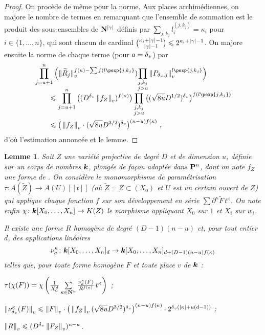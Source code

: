\documentclass[11pt, twoside, a4paper]{article}
\newtheorem{lem}[thm]{Lemme} \newtheorem{coro}[thm]{Corollaire}
\theoremstyle{definition}
\begin{document}
\begin{proof}
  On procède de même pour la norme. Aux places archimédiennes, on majore le
  nombre de termes en remarquant que l'ensemble de sommation est le produit des
  sous-ensembles de $\mathbf{N}^{{\lvert\gamma\rvert}}$ définis par $\sum_{j, k_j} l_i^ {(j, k_j)}
  = \kappa_i$ pour $i \in \{1,\ldots,n\}$, qui sont chacun de cardinal
  $\binom{\kappa_i + {\lvert\gamma\rvert} - 1}{{\lvert\gamma\rvert} - 1} \leqslant 2^{\kappa_i +
    {\lvert\gamma\rvert} - 1}$. On majore ensuite la norme de chaque terme (pour $a =
  {\delta\smash{_v}}$) par
  \begin{align*}
    & \prod_{j=u+1}^n \left( \nv{\smash{\widetilde R_j}}^{f(\kappa) - \sum
        f(l\pexp{j, k_j}}) \smash{\prod_{\substack{j, k_j \\ j > u}}}
      \nv{P_{\dv, j}}^{l\pexp{j, k_j}} \right) \\
    & \qquad\le \prod_{j=u+1}^n \big( (D^\dv \nv{f_Z})^{f(\kappa)} \big)
      \prod_{\substack{j, k_j \\ j > u}}  \big( (\sqrt{8u} D^{1/2})^\dv
      \big)^{f(l\pexp{j, k_j})} \\
    & \qquad\le \big( \nv{f_Z} \cdot (\sqrt{8u}D^{3/2})^\dv
      \big)^{(n-u)f(\kappa)} \pmm,
  \end{align*}
  d'où l'estimation annoncée et le lemme.
\end{proof}

\begin{lem} \label{l-param}
  Soit $Z$ une variété projective de degré $D$ et de dimension $u$, définie
  sur un corps de nombres $\boldsymbol{k}$, plongée de façon adaptée dans $\mathbf{P}^n$, dont
  on note $f_Z$ une forme de . On considère le monomorphisme de
  paramétrisation $\tau \colon A(\widetilde Z) \to A(U)[[t]]$ (où $\widetilde Z
  = Z \subset (X_0)$ et $U$ est un certain ouvert de $Z$) qui applique chaque
  fonction $f$ sur son développement en série $\sum \partial^\kappa \tilde F \,
  t^\kappa$.  On note enfin $\chi \colon \boldsymbol{k}[X_0, \ldots, X_n] \to K(Z)$ le
  morphisme appliquant $X_0$ sur $1$ et $X_i$ sur $w_i$.

  Il existe une forme $R$ homogène de degré $(D-1)(n-u)$ et, pour tout entier
  $d$, des applications linéaires \[ \nu_a^\kappa \colon \boldsymbol{k}[X_0, \ldots,
  X_n]_d \to \boldsymbol{k}[X_0, \ldots, X_n]_{d + (D-1)(n-u)f(\kappa)} \] telles que,
  pour toute forme homogène $F$ et toute place $v$ de $\boldsymbol{k}$ :
  \begin{enumthm}
    \item $\tau(\chi(F)) = \chi\left( \frac1{X_0^d} \sum\limits_{\kappa \in
        \mathbf{N}^u} \frac {\nu_a^\kappa(F)} {R^{f(\kappa)}} \, t^\kappa \right)$  ;
    \item $\left\lVert\nu_{\delta\smash{_v}}^\kappa(F)\right\rVert_{v} \leqslant \left\lVert F\right\rVert_{v} \cdot \big( \left\lVert f_Z\right\rVert_{v}
      (\sqrt{8u}D^{3/2})^{\delta\smash{_v}} \big)^{(n-u)f(\kappa)} \cdot 2^{{\delta\smash{_v}} ({\lvert\kappa\rvert} +
        u(d-1))}$ ; \label{i-norme}
    \item $\left\lVert R\right\rVert_{v} \leqslant (D^{\delta\smash{_v}} \left\lVert F_Z\right\rVert_{v})^{n-u}$.
  \end{enumthm}
\end{lem}
\end{document}

